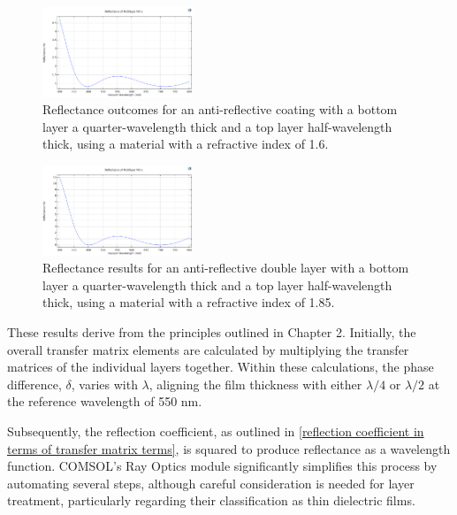 \begin{figure}[ht!]
  \centering
  \includegraphics[width=0.4\textwidth]{Chapters/Figures/Chapter 4 Figures/Antireflective Figure b.png}
  \caption{Reflectance outcomes for an anti-reflective coating with a bottom layer a quarter-wavelength thick and a top layer half-wavelength thick, using a material with a refractive index of 1.6.}
  \label{fig:Antireflective Figure b}
\end{figure}

\begin{figure}[ht!]
  \centering
  \includegraphics[width=0.4\textwidth]{Chapters/Figures/Chapter 4 Figures/Antireflective Figure c.png}
  \caption{Reflectance results for an anti-reflective double layer with a bottom layer a quarter-wavelength thick and a top layer half-wavelength thick, using a material with a refractive index of 1.85.}
  \label{fig:Antireflective Figure c}
\end{figure}

These results derive from the principles outlined in Chapter 2. Initially, the overall transfer matrix elements are calculated by multiplying the transfer matrices of the individual layers together. Within these calculations, the phase difference, $\delta$, varies with $\lambda$, aligning the film thickness with either $\lambda/4$ or $\lambda/2$ at the reference wavelength of 550 nm.

Subsequently, the reflection coefficient, as outlined in \ref{reflection coefficient in terms of transfer matrix terms}, is squared to produce reflectance as a wavelength function. COMSOL's Ray Optics module significantly simplifies this process by automating several steps, although careful consideration is needed for layer treatment, particularly regarding their classification as thin dielectric films.

